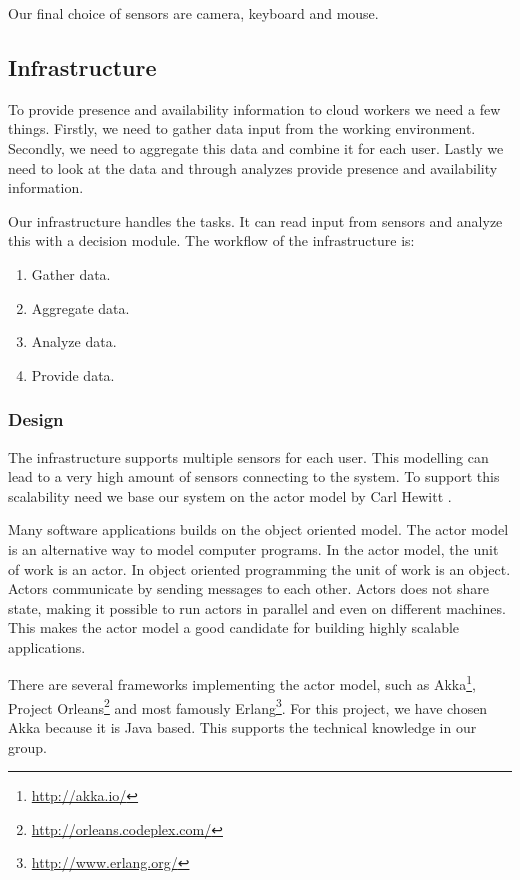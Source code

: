 \documentclass{sigchi}
\begin{document}
Our final choice of sensors are camera, keyboard and mouse.

\subsection{Infrastructure}
To provide presence and availability information to cloud workers we need a few things.
Firstly, we need to gather data input from the working environment.
Secondly, we need to aggregate this data and combine it for each user. Lastly we need to look at the data and through analyzes provide presence and availability information.

Our infrastructure handles the tasks. It can read input from sensors and analyze this with a decision module.
The workflow of the infrastructure is:

\begin{enumerate}
  \item Gather data.
  \item Aggregate data.
  \item Analyze data.
  \item Provide data.
\end{enumerate}

\subsubsection{Design}
The infrastructure supports multiple sensors for each user.
This modelling can lead to a very high amount of sensors connecting to the system.
To support this scalability need we base our system on the actor model by Carl Hewitt \cite{hewitt1973universal}.

Many software applications builds on the object oriented model.
The actor model is an alternative way to model computer programs.
In the actor model, the unit of work is an actor.
In object oriented programming the unit of work is an object.
Actors communicate by sending messages to each other.
Actors does not share state, making it possible to run actors in parallel and even on different machines.
This makes the actor model a good candidate for building highly scalable applications.

There are several frameworks implementing the actor model, such as Akka\footnote{\url{http://akka.io/}}, Project Orleans\footnote{\url{http://orleans.codeplex.com/}} and most famously Erlang\footnote{\url{http://www.erlang.org/}}.
For this project, we have chosen Akka because it is Java based.
This supports the technical knowledge in our group.
\end{document}
